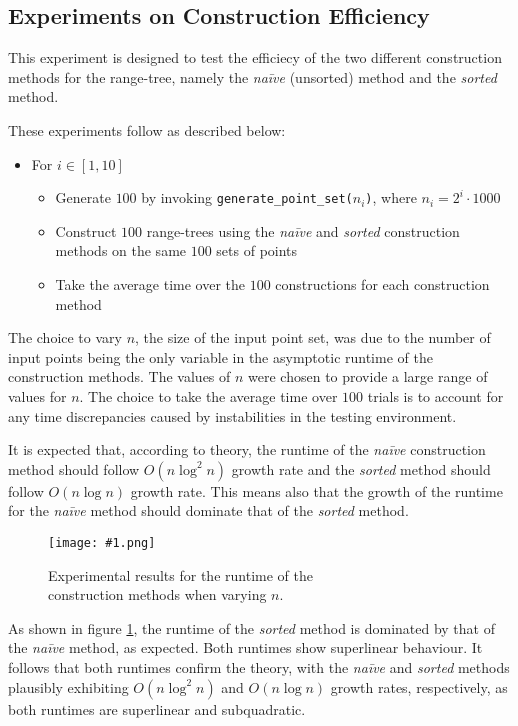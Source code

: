 \documentclass[12pt]{article}
\newcommand{\naive}{\textit{naīve} }
\newcommand{\sorted}{\textit{sorted} }
\newcommand{\fig}[2]{
  \begin{figure}[h]
    \centering
    \texttt{[image: \#1.png]}
    \caption{#2}
    \label{fig:#1}
  \end{figure}
}
\begin{document}
\newpage

\subsection*{Experiments on Construction Efficiency}
This experiment is designed to test the efficiecy of the two different construction methods for the range-tree, namely the \naive (unsorted) method and the \sorted method.

These experiments follow as described below:
\begin{itemize}
  \item 
    For $i \in [1, 10]$
    \begin{itemize}
      \item 
        Generate $100$ by invoking \texttt{generate\_point\_set($n_i$)}, where $n_i = 2^i \cdot 1000$
      \item 
        Construct $100$ range-trees using the \naive and \sorted construction methods on the same $100$ sets of points
      \item 
        Take the average time over the $100$ constructions for each construction method
    \end{itemize}
\end{itemize}

The choice to vary $n$, the size of the input point set, was due to the number of input points being the only variable in the asymptotic runtime of the construction methods. The values of $n$ were chosen to provide a large range of values for $n$. The choice to take the average time over $100$ trials is to account for any time discrepancies caused by instabilities in the testing environment.

It is expected that, according to theory, the runtime of the \naive construction method should follow $O\left( n \log^2 n \right)$ growth rate and the \sorted method should follow $O\left( n \log n \right)$ growth rate. This means also that the growth of the runtime for the \naive method should dominate that of the \sorted method.

\fig{constr}{Experimental results for the runtime of the \\ construction methods when varying $n$.}

As shown in figure \ref{fig:constr}, the runtime of the \sorted method is dominated by that of the \naive method, as expected. Both runtimes show superlinear behaviour. It follows that both runtimes confirm the theory, with the \naive and \sorted methods plausibly exhibiting $O\left( n \log^2 n \right)$ and $O\left( n \log n \right)$ growth rates, respectively, as both runtimes are superlinear and subquadratic.
\end{document}
